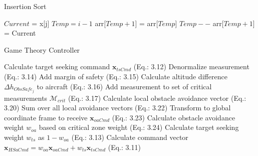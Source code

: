 \documentclass[a4paper,11pt]{article}
\begin{document}
 
\begin{algorithm}
	\caption{Insertion Sort} 
	\begin{algorithmic}[1]
			\State $Current$ = x[j]
                \State $Temp = i - 1$
                \State arr[$Temp + 1$] = arr[$Temp$]
				\State $Temp--$
                \EndWhile
                \State arr[$Temp + 1$] = Current
			\EndFor

		\EndFor
	\end{algorithmic} 
\end{algorithm}

\begin{algorithm}
	\caption{Game Theory Controller}
	\begin{algorithmic}[1]
		\State Calculate target seeking command $\mathbf{x}_{tsCmd}$ (Eq.: 3.12)
		\State Denormalize measurement (Eq.: 3.14)
		\State Add margin of safety (Eq.: 3.15)
		\State Calculate altitude difference $\Delta h_{ObsSafe_{j}}$ to aircraft (Eq.: 3.16)
		\State Add measurement to set of critical measurements $\mathcal{M}_{crit}$ (Eq.: 3.17)
		\EndIf
		\EndFor
		\State Calculate local obstacle avoidance vector (Eq.: 3.20)
		\EndFor
		\State Sum over all local avoidance vectors (Eq.: 3.22)
		\State Transform to global coordinate frame to receive $\mathbf{x}_{oaCmd}$ (Eq.: 3.23)
		\State Calculate obstacle avoidance weight $w_{oa}$ based on critical zone weight (Eq.: 3.24)
		\State Calculate target seeking weight $w_{ts}$ as $1-w_{oa}$ (Eq.: 3.13)
		\State Calculate command vector $\mathbf{x}_{HSaCmd}=w_{oa}\mathbf{x}_{oaCmd}+w_{ts}\mathbf{x}_{tsCmd}$ (Eq.: 3.11)
		\EndFor
	\end{algorithmic} 
\end{algorithm} 
\end{document}
